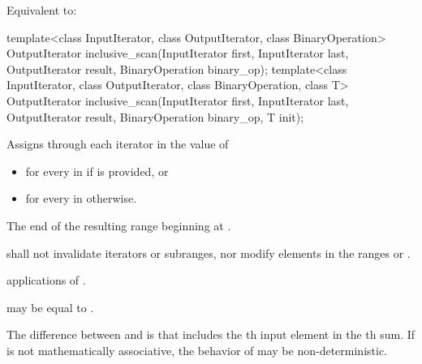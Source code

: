 \begin{itemdescr}
\pnum
\effects
Equivalent to: 
\end{itemdescr}

\begin{itemdecl}
template<class InputIterator, class OutputIterator, class BinaryOperation>
  OutputIterator inclusive_scan(InputIterator first, InputIterator last,
                                OutputIterator result,
                                BinaryOperation binary_op);
template<class InputIterator, class OutputIterator, class BinaryOperation, class T>
  OutputIterator inclusive_scan(InputIterator first, InputIterator last,
                                OutputIterator result,
                                BinaryOperation binary_op, T init);
\end{itemdecl}

\begin{itemdescr}
\pnum
\effects
Assigns through each iterator  in  the value of
\begin{itemize}
\item
{}
for every  in 
if  is provided, or
\item
{}
for every  in  otherwise.
\end{itemize}

\pnum
\returns
The end of the resulting range beginning at .

\pnum
\requires
{} shall not invalidate iterators or subranges, nor modify
elements in the ranges  or .

\pnum
\complexity
{} applications of .

\pnum
\remarks
{} may be equal to .

\pnum
\realnotes
The difference between  and  is
that  includes the th input element in the
th sum.  If  is not mathematically associative, the
behavior of  may be non-deterministic.
\end{itemdescr}

